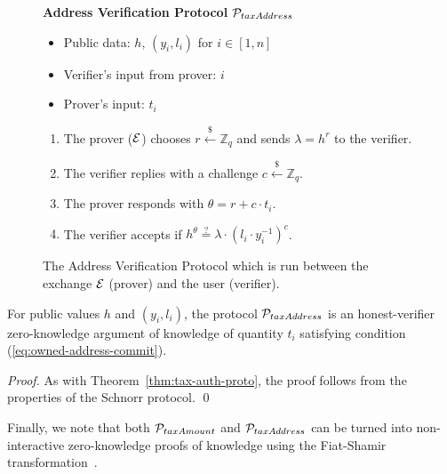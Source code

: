 \begin{figure}[h]
\begin{mdframed}

\begin{center}
    \textbf{Address Verification Protocol} $\mathcal{P}_{taxAddress}$
\end{center}

    \begin{itemize}
        \item Public data: $h$, $(y_i, l_i)$ for $i \in [1, n]$
        \item Verifier's input from prover: $i$
        \item Prover's input: $t_i$
    \end{itemize}

    \begin{enumerate}
        \item The prover ($\mathcal{E}$) chooses $r \xleftarrow{\$} \mathbb{Z}_q$
            and sends $\lambda = h^r$ to the verifier.
        \item The verifier replies with a challenge $c \xleftarrow{\$} \mathbb{Z}_q$.
        \item The prover responds with $\theta = r + c \cdot t_i$.
        \item The verifier accepts if $h^\theta \stackrel{?}{=} \lambda \cdot (l_i \cdot y_i^{-1})^c$.
    \end{enumerate}

\end{mdframed}
\caption{
    The Address Verification Protocol which is run between the exchange $\mathcal{E}$
    (prover) and the user (verifier).
}
\label{fig:taxation_verification_proto}
\end{figure}

\begin{theorem}
    For public values $h$ and $(y_i, l_i)$, the protocol
    $\mathcal{P}_{taxAddress}$ is an honest-verifier zero-knowledge argument of
    knowledge of quantity $t_i$ satisfying condition (\ref{eq:owned-address-commit}).
\end{theorem}
\begin{proof}
    As with Theorem~\ref{thm:tax-auth-proto}, the proof follows from the
    properties of the Schnorr protocol. \qed
\end{proof}

Finally, we note that both $\mathcal{P}_{taxAmount}$ and $\mathcal{P}_{taxAddress}$ can be
turned into non-interactive zero-knowledge proofs of knowledge using the
Fiat-Shamir transformation~\cite{C:FiaSha86}.
